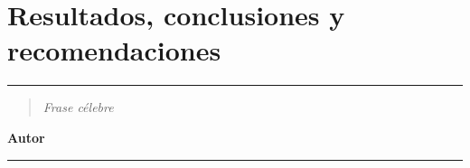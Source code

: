 \chapter{Resultados, conclusiones y recomendaciones}

\noindent
\rule{\linewidth}{1 pt}
\begin{flushright}
\begin{quotation}
\small{
\textit{Frase célebre}}
\end{quotation}
\bf{Autor}
\end{flushright}
\noindent
\rule{\linewidth}{1 pt}\\

